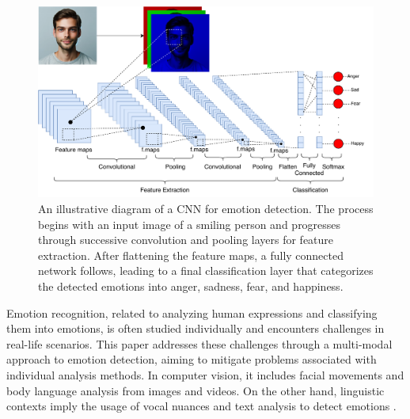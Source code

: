 \documentclass[runningheads]{llncs}
\begin{document}
\begin{figure}[htb]
\centering
\includegraphics[width=0.97\linewidth]{CNNArchitecture.pdf}
\caption{An illustrative diagram of a CNN for emotion detection. The process begins with an input image of a smiling person and progresses through successive convolution and pooling layers for feature extraction. After flattening the feature maps, a fully connected network follows, leading to a final classification layer that categorizes the detected emotions into anger, sadness, fear, and happiness.}
\label{fig:cnnarchitecture}
\end{figure}

Emotion recognition, related to analyzing human expressions and classifying them into emotions, is often studied individually and encounters challenges in real-life scenarios. This paper addresses these challenges through a multi-modal approach to emotion detection, aiming to mitigate problems associated with individual analysis methods. In computer vision, it includes facial movements and body language analysis from images and videos. On the other hand, linguistic contexts imply the usage of vocal nuances and text analysis to detect emotions \cite{Chul2018, Trigeorgis2016, Karna2020}. 
\end{document}
